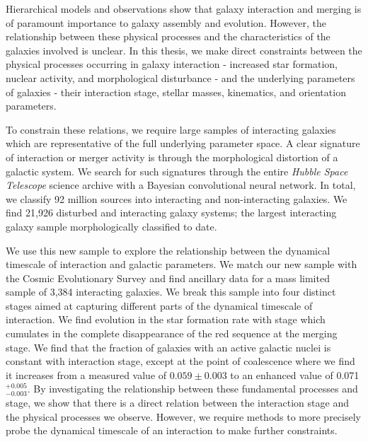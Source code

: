 

\begin{abstracts}        %
Hierarchical models and observations show that galaxy interaction and merging is of paramount importance to galaxy assembly and evolution. However, the relationship between these physical processes and the characteristics of the galaxies involved is unclear. In this thesis, we make direct constraints between the physical processes occurring in galaxy interaction - increased star formation, nuclear activity, and morphological disturbance - and the underlying parameters of galaxies - their interaction stage, stellar masses, kinematics, and orientation parameters. 

To constrain these relations, we require large samples of interacting galaxies which are representative of the full underlying parameter space. A clear signature of interaction or merger activity is through the morphological distortion of a galactic system. We search for such signatures through the entire \emph{Hubble Space Telescope} science archive with a Bayesian convolutional neural network. In total, we classify 92 million sources into interacting and non-interacting galaxies. We find 21,926 disturbed and interacting galaxy systems; the largest interacting galaxy sample morphologically classified to date. 

We use this new sample to explore the relationship between the dynamical timescale of interaction and galactic parameters. We match our new sample with the Cosmic Evolutionary Survey and find ancillary data for a mass limited sample of 3,384 interacting galaxies. We break this sample into four distinct stages aimed at capturing different parts of the dynamical timescale of interaction. We find evolution in the star formation rate with stage which cumulates in the complete disappearance of the red sequence at the merging stage. We find that the fraction of galaxies with an active galactic nuclei is constant with interaction stage, except at the point of coalescence where we find it increases from a measured value of $0.059\pm0.003$ to an enhanced value of 0.071$^{+0.005}_{-0.003}$. By investigating the relationship between these fundamental processes and stage, we show that there is a direct relation between the interaction stage and the physical processes we observe. However, we require methods to more precisely probe the dynamical timescale of an interaction to make further constraints.


\end{abstracts}
